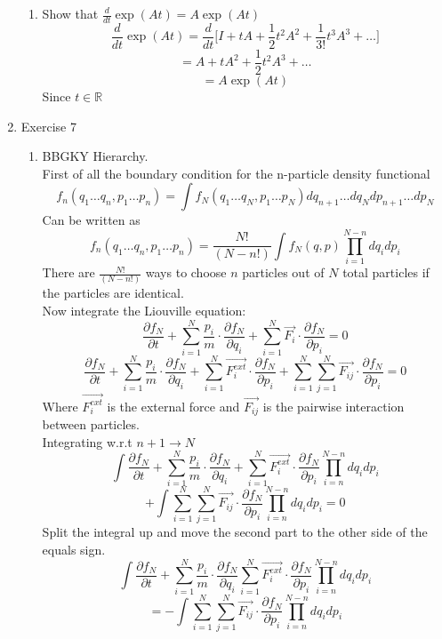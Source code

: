\documentclass[12pt]{article}
\begin{document}
\begin{enumerate}
\begin{enumerate}
    \item Show that $\frac{d}{dt} \exp(At) = A\exp(At)$
    $$ \frac{d}{dt} \exp(At) = \frac{d}{dt} \bigg[I+tA+\frac{1}{2}t^2A^2 + \frac{1}{3!}t^3A^3 +\ldots\bigg]$$
    $$ = A + tA^2 + \frac{1}{2} t^2 A^3 + \ldots $$ 
    $$ = A\exp(At) $$
    Since $t \in \mathbb{R} $

\end{enumerate}


\item Exercise 7
\begin{enumerate}
    \item BBGKY Hierarchy.
    \\ First of all the boundary condition for the n-particle density functional 
    $$ f_n(q_1 \ldots q_n,p_1 \ldots p_n ) = \int f_N (q_1 \ldots q_N,p_1 \ldots p_N) dq_{n+1} \ldots dq_N dp_{n+1} \ldots dp_N $$ 
    Can be written as 
    $$ f_n(q_1 \ldots q_n,p_1 \ldots p_n ) = \frac{N!}{(N-n!)} \int f_N(q,p) \prod_{i=1}^{N-n} dq_i dp_i$$
    There are $\frac{N!}{(N-n!)}$ ways to choose $n$ particles out of $N$ total particles if the particles are identical. 
    \\ Now integrate the Liouville equation:
    $$ \frac{\partial f_N}{\partial t} + \sum_{i=1}^N \frac{p_i}{m} \cdot \frac{\partial f_N}{\partial q_i} + \sum_{i=1}^N \vec{F_i} \cdot \frac{\partial f_N}{\partial p_i} =0 $$
    $$ \frac{\partial f_N}{\partial t} + \sum_{i=1}^N \frac{p_i}{m} \cdot \frac{\partial f_N}{\partial q_i} + \sum_{i=1}^N \vec{F_i^{ext}} \cdot \frac{\partial f_N}{\partial p_i} + \sum_{i=1}^N \sum_{j=1}^N \vec{F_{ij}} \cdot \frac{\partial f_N}{\partial p_i} = 0 $$
    Where $\vec{F_i^{ext}} $ is the external force and $\vec{F_{ij}}$ is the pairwise interaction between particles. 
    \\ Integrating w.r.t $n+1 \rightarrow N$ 
    $$ \int \frac{\partial f_N}{\partial t} + \sum_{i=1}^N \frac{p_i}{m} \cdot \frac{\partial f_N}{\partial q_i} + \sum_{i=1}^N \vec{F_i^{ext}} \cdot \frac{\partial f_N}{\partial p_i} \prod_{i=n}^{N-n} dq_i dp_i $$
    $$ + \int \sum_{i=1}^N \sum_{j=1}^N \vec{F_{ij}} \cdot \frac{\partial f_N}{\partial p_i} \prod_{i=n}^{N-n} dq_i dp_i =0 $$
    Split the integral up and move the second part to the other side of the equals sign. 
    $$ \int \frac{\partial f_N}{\partial t} + \sum_{i=1}^N \frac{p_i}{m} \cdot \frac{\partial f_N}{\partial q_i} \sum_{i=1}^N \vec{F_i^{ext}} \cdot \frac{\partial f_N}{\partial p_i} \prod_{i=n}^{N-n} dq_i dp_i  $$
    $$ = -  \int \sum_{i=1}^N \sum_{j=1}^N \vec{F_{ij}} \cdot \frac{\partial f_N}{\partial p_i} \prod_{i=n}^{N-n} dq_i dp_i $$

\end{enumerate}
\end{enumerate}
\end{document}
